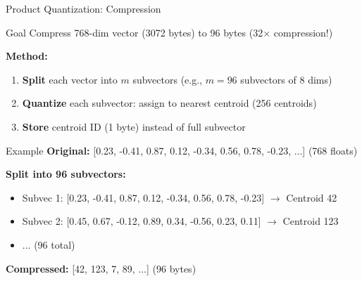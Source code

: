 \documentclass[aspectratio=169]{beamer}
\newif\ifanimated
\newcommand{\cpause}{\ifanimated\pause\fi}
\begin{document}
\begin{frame}[shrink=10]{Product Quantization: Compression}
\begin{block}{Goal}
Compress 768-dim vector (3072 bytes) to 96 bytes (32$\times$ compression!)
\end{block}
\cpause

\vspace{1em}

\textbf{Method:}
\begin{enumerate}
    \item \textbf{Split} each vector into $m$ subvectors (e.g., $m=96$ subvectors of 8 dims)
    \item \textbf{Quantize} each subvector: assign to nearest centroid (256 centroids)
    \item \textbf{Store} centroid ID (1 byte) instead of full subvector
\end{enumerate}

\vspace{1em}

\begin{exampleblock}{Example}
\textbf{Original:} [0.23, -0.41, 0.87, 0.12, -0.34, 0.56, 0.78, -0.23, ...] (768 floats)

\textbf{Split into 96 subvectors:}
\begin{itemize}
    \item Subvec 1: [0.23, -0.41, 0.87, 0.12, -0.34, 0.56, 0.78, -0.23] $\rightarrow$ Centroid 42
    \item Subvec 2: [0.45, 0.67, -0.12, 0.89, 0.34, -0.56, 0.23, 0.11] $\rightarrow$ Centroid 123
    \item ... (96 total)
\end{itemize}

\textbf{Compressed:} [42, 123, 7, 89, ...] (96 bytes)
\end{exampleblock}
\cpause
\end{frame}
\end{document}
